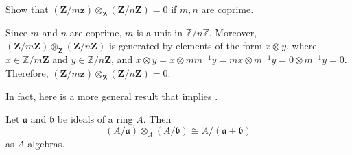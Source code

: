 \begin{exercise}
Show that \((\mathbf{Z} / m \mathbf{z}) \otimes_{\mathbf{Z}} (\mathbf{Z} / n \mathbf{Z}) = 0\) if \(m, n\) are coprime.
\end{exercise}

\begin{solution}
Since \(m\) and \(n\) are coprime, \(m\) is a unit in \(\mathbb{Z} / n \mathbb{Z}\).
Moreover, \((\mathbf{Z} / m \mathbf{Z}) \otimes_{\mathbf{Z}} (\mathbf{Z} / n \mathbf{Z})\) is generated by elements of the form \(x \otimes y\), where \(x \in \mathbb{Z} / m \mathbf{Z}\) and \(y \in \mathbb{Z} / n \mathbf{Z}\), and \(x \otimes y = x \otimes m m^{-1} y = m x \otimes m^{-1} y = 0 \otimes m^{-1} y = 0\).
Therefore, \((\mathbf{Z} / m \mathbf{z}) \otimes_{\mathbf{Z}} (\mathbf{Z} / n \mathbf{Z}) = 0\).
\end{solution}

In fact, here is a more general result that implies .

\begin{claim}
Let \(\mathfrak{a}\) and \(\mathfrak{b}\) be ideals of a ring \(A\).
Then
\begin{equation*}
(A / \mathfrak{a}) \otimes_A (A / \mathfrak{b}) \cong A / (\mathfrak{a} + \mathfrak{b})
\end{equation*}
as \(A\)-algebras.
\end{claim}

